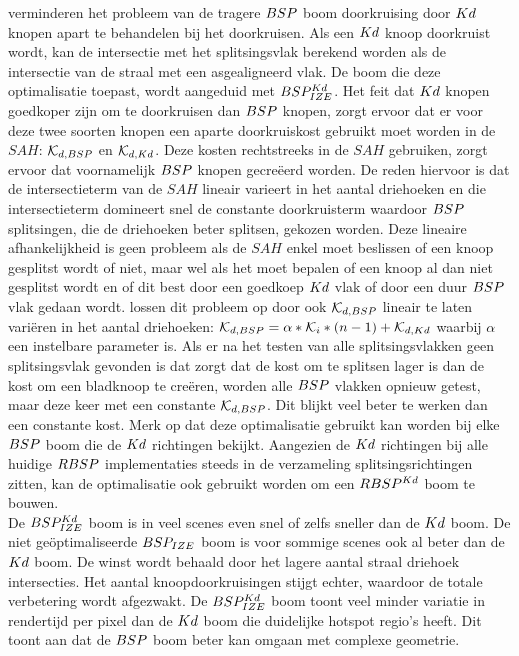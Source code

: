     \authorIze{} \cite{ize} verminderen het probleem van de tragere $BSP$ boom doorkruising door $Kd$ knopen apart te behandelen bij het doorkruisen. 
    Als een $Kd$ knoop doorkruist wordt, kan de intersectie met het splitsingsvlak berekend worden als de intersectie van de straal met een asgealigneerd vlak. 
    De boom die deze optimalisatie toepast, wordt aangeduid met $BSP^{Kd}_{IZE}$.
    Het feit dat $Kd$ knopen goedkoper zijn om te doorkruisen dan $BSP$ knopen, zorgt ervoor dat er voor deze twee soorten knopen een aparte doorkruiskost gebruikt moet worden in de $SAH$: $\mathcal{K}_{d,BSP}$ en $\mathcal{K}_{d,Kd}$.
    Deze kosten rechtstreeks in de $SAH$ gebruiken, zorgt ervoor dat voornamelijk $BSP$ knopen gecreëerd worden.
    De reden hiervoor is dat de intersectieterm van de $SAH$ lineair varieert in het aantal driehoeken en die intersectieterm domineert snel de constante doorkruisterm waardoor $BSP$ splitsingen, die de driehoeken beter splitsen, gekozen worden.
    Deze lineaire afhankelijkheid is geen probleem als de $SAH$ enkel moet beslissen of een knoop gesplitst wordt of niet, maar wel als het moet bepalen of een knoop al dan niet gesplitst wordt en of dit best door een goedkoep $Kd$ vlak of door een duur $BSP$ vlak gedaan wordt.
    \authorIze{} \cite{ize} lossen dit probleem op door ook $\mathcal{K}_{d,BSP}$ lineair te laten variëren in het aantal driehoeken: $\mathcal{K}_{d,BSP} = \alpha * \mathcal{K}_i * (n - 1) + \mathcal{K}_{d,Kd}$ waarbij $\alpha$ een instelbare parameter is.
    Als er na het testen van alle splitsingsvlakken geen splitsingsvlak gevonden is dat zorgt dat de kost om te splitsen lager is dan de kost om een bladknoop te creëren, worden alle $BSP$ vlakken opnieuw getest, maar deze keer met een constante $\mathcal{K}_{d,BSP}$. Dit blijkt veel beter te werken dan een constante kost. Merk op dat deze optimalisatie gebruikt kan worden bij elke $BSP$ boom die de $Kd$ richtingen bekijkt. Aangezien de $Kd$ richtingen bij alle huidige $RBSP$ implementaties steeds in de verzameling splitsingsrichtingen zitten, kan de optimalisatie ook gebruikt worden om een $RBSP^{Kd}$ boom te bouwen.\\
    
    De $BSP^{Kd}_{IZE}$ boom is in veel scenes even snel of zelfs sneller dan de $Kd$ boom.
    De niet geöptimaliseerde $BSP_{IZE}$ boom is voor sommige scenes ook al beter dan de $Kd$ boom. 
    De winst wordt behaald door het lagere aantal straal driehoek intersecties.
    Het aantal knoopdoorkruisingen stijgt echter, waardoor de totale verbetering wordt afgezwakt. De $BSP^{Kd}_{IZE}$ boom toont veel minder variatie in rendertijd per pixel dan de $Kd$ boom die duidelijke hotspot regio's heeft. Dit toont aan dat de $BSP$ boom beter kan omgaan met complexe geometrie.


